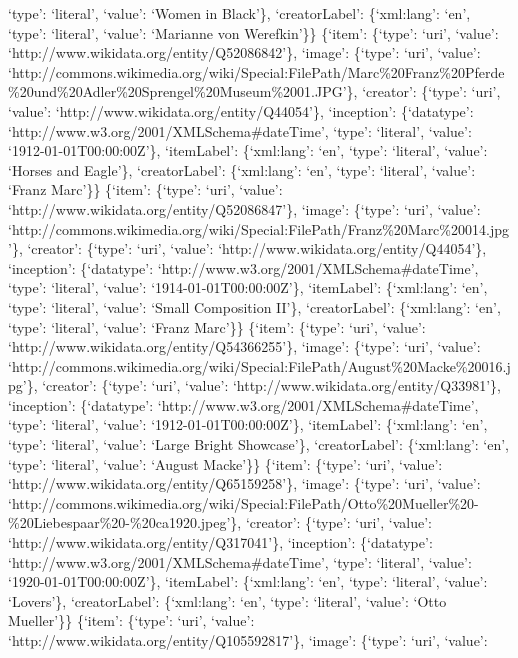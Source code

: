 \documentclass[
  letterpaper,
]{book}
\begin{document}
`type': `literal', `value': `Women in Black'\}, `creatorLabel':
\{`xml:lang': `en', `type': `literal', `value': `Marianne von
Werefkin'\}\} \{`item': \{`type': `uri', `value':
`http://www.wikidata.org/entity/Q52086842'\}, `image': \{`type': `uri',
`value':
`http://commons.wikimedia.org/wiki/Special:FilePath/Marc\%20Franz\%20Pferde\%20und\%20Adler\%20Sprengel\%20Museum\%2001.JPG'\},
`creator': \{`type': `uri', `value':
`http://www.wikidata.org/entity/Q44054'\}, `inception': \{`datatype':
`http://www.w3.org/2001/XMLSchema\#dateTime', `type': `literal',
`value': `1912-01-01T00:00:00Z'\}, `itemLabel': \{`xml:lang': `en',
`type': `literal', `value': `Horses and Eagle'\}, `creatorLabel':
\{`xml:lang': `en', `type': `literal', `value': `Franz Marc'\}\}
\{`item': \{`type': `uri', `value':
`http://www.wikidata.org/entity/Q52086847'\}, `image': \{`type': `uri',
`value':
`http://commons.wikimedia.org/wiki/Special:FilePath/Franz\%20Marc\%20014.jpg'\},
`creator': \{`type': `uri', `value':
`http://www.wikidata.org/entity/Q44054'\}, `inception': \{`datatype':
`http://www.w3.org/2001/XMLSchema\#dateTime', `type': `literal',
`value': `1914-01-01T00:00:00Z'\}, `itemLabel': \{`xml:lang': `en',
`type': `literal', `value': `Small Composition II'\}, `creatorLabel':
\{`xml:lang': `en', `type': `literal', `value': `Franz Marc'\}\}
\{`item': \{`type': `uri', `value':
`http://www.wikidata.org/entity/Q54366255'\}, `image': \{`type': `uri',
`value':
`http://commons.wikimedia.org/wiki/Special:FilePath/August\%20Macke\%20016.jpg'\},
`creator': \{`type': `uri', `value':
`http://www.wikidata.org/entity/Q33981'\}, `inception': \{`datatype':
`http://www.w3.org/2001/XMLSchema\#dateTime', `type': `literal',
`value': `1912-01-01T00:00:00Z'\}, `itemLabel': \{`xml:lang': `en',
`type': `literal', `value': `Large Bright Showcase'\}, `creatorLabel':
\{`xml:lang': `en', `type': `literal', `value': `August Macke'\}\}
\{`item': \{`type': `uri', `value':
`http://www.wikidata.org/entity/Q65159258'\}, `image': \{`type': `uri',
`value':
`http://commons.wikimedia.org/wiki/Special:FilePath/Otto\%20Mueller\%20-\%20Liebespaar\%20-\%20ca1920.jpeg'\},
`creator': \{`type': `uri', `value':
`http://www.wikidata.org/entity/Q317041'\}, `inception': \{`datatype':
`http://www.w3.org/2001/XMLSchema\#dateTime', `type': `literal',
`value': `1920-01-01T00:00:00Z'\}, `itemLabel': \{`xml:lang': `en',
`type': `literal', `value': `Lovers'\}, `creatorLabel': \{`xml:lang':
`en', `type': `literal', `value': `Otto Mueller'\}\} \{`item': \{`type':
`uri', `value': `http://www.wikidata.org/entity/Q105592817'\}, `image':
\{`type': `uri', `value':
\end{document}
